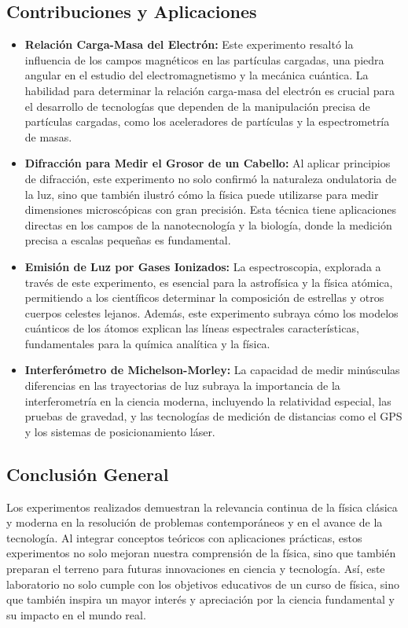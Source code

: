 \subsection{Contribuciones y Aplicaciones}
\begin{itemize}
    \item \textbf{Relación Carga-Masa del Electrón:} Este experimento resaltó la influencia de los campos magnéticos en las partículas cargadas, una piedra angular en el estudio del electromagnetismo y la mecánica cuántica. La habilidad para determinar la relación carga-masa del electrón es crucial para el desarrollo de tecnologías que dependen de la manipulación precisa de partículas cargadas, como los aceleradores de partículas y la espectrometría de masas.
    
    \item \textbf{Difracción para Medir el Grosor de un Cabello:} Al aplicar principios de difracción, este experimento no solo confirmó la naturaleza ondulatoria de la luz, sino que también ilustró cómo la física puede utilizarse para medir dimensiones microscópicas con gran precisión. Esta técnica tiene aplicaciones directas en los campos de la nanotecnología y la biología, donde la medición precisa a escalas pequeñas es fundamental.
    
    \item \textbf{Emisión de Luz por Gases Ionizados:} La espectroscopia, explorada a través de este experimento, es esencial para la astrofísica y la física atómica, permitiendo a los científicos determinar la composición de estrellas y otros cuerpos celestes lejanos. Además, este experimento subraya cómo los modelos cuánticos de los átomos explican las líneas espectrales características, fundamentales para la química analítica y la física.
    
    \item \textbf{Interferómetro de Michelson-Morley:} La capacidad de medir minúsculas diferencias en las trayectorias de luz subraya la importancia de la interferometría en la ciencia moderna, incluyendo la relatividad especial, las pruebas de gravedad, y las tecnologías de medición de distancias como el GPS y los sistemas de posicionamiento láser.
\end{itemize}

\subsection{Conclusión General}
Los experimentos realizados demuestran la relevancia continua de la física clásica y moderna en la resolución de problemas contemporáneos y en el avance de la tecnología. Al integrar conceptos teóricos con aplicaciones prácticas, estos experimentos no solo mejoran nuestra comprensión de la física, sino que también preparan el terreno para futuras innovaciones en ciencia y tecnología. Así, este laboratorio no solo cumple con los objetivos educativos de un curso de física, sino que también inspira un mayor interés y apreciación por la ciencia fundamental y su impacto en el mundo real.

